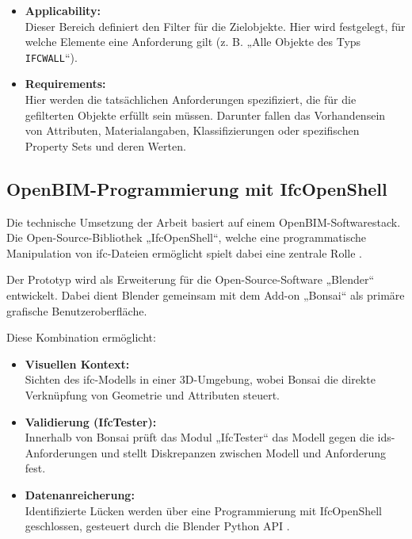 \begin{itemize}
    \item \textbf{Applicability:} \\
    Dieser Bereich definiert den Filter für die Zielobjekte. Hier wird festgelegt, 
    für welche Elemente eine Anforderung gilt (z. B. „Alle Objekte des Typs \texttt{IFCWALL}“).
    \item \textbf{Requirements:} \\
    Hier werden die tatsächlichen Anforderungen spezifiziert, die für die gefilterten 
    Objekte erfüllt sein müssen. Darunter fallen das Vorhandensein von Attributen, 
    Materialangaben, Klassifizierungen oder spezifischen Property Sets und 
    deren Werten.
\end{itemize}


\subsection{OpenBIM-Programmierung mit IfcOpenShell}
\label{subsec:ifcopenshell}
Die technische Umsetzung der Arbeit basiert auf einem OpenBIM-Softwarestack. Die Open-Source-Bibliothek 
„IfcOpenShell“, welche eine programmatische Manipulation von \gls{ifc}-Dateien ermöglicht spielt dabei 
eine zentrale Rolle \cite{ifcopenshell}.

Der Prototyp wird als Erweiterung für die Open-Source-Software „Blender“ entwickelt. 
Dabei dient Blender gemeinsam mit dem Add-on „Bonsai“ \cite{ifcopenshell} als primäre grafische 
Benutzeroberfläche.

Diese Kombination ermöglicht:
\begin{itemize}
    \item \textbf{Visuellen Kontext:} \\
    Sichten des \gls{ifc}-Modells in einer 3D-Umgebung, wobei Bonsai 
    die direkte Verknüpfung von Geometrie und Attributen steuert.
    \item \textbf{Validierung (IfcTester):} \\
    Innerhalb von Bonsai prüft das Modul „IfcTester“ das Modell gegen die 
    \gls{ids}-Anforderungen und stellt Diskrepanzen zwischen Modell und Anforderung fest.
    \item \textbf{Datenanreicherung:} \\ Identifizierte Lücken werden über eine Programmierung mit
    IfcOpenShell geschlossen, gesteuert durch die Blender Python API \cite{blenderAPI}.
\end{itemize}

